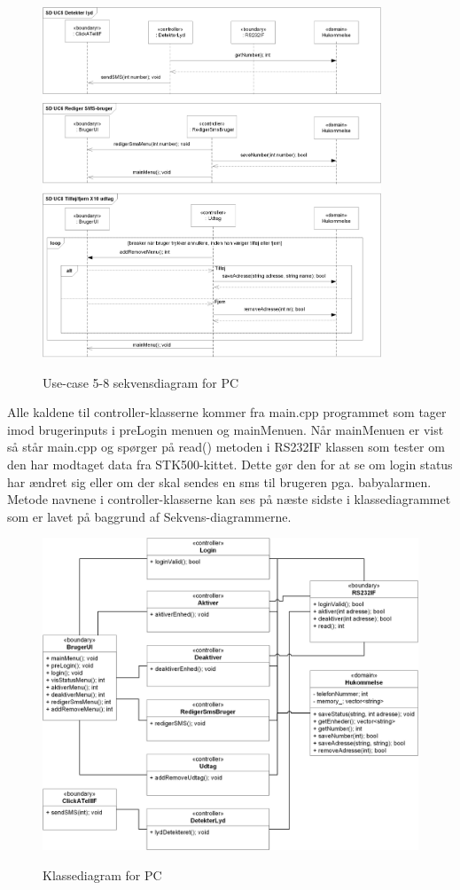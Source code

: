 \begin{figure}[H] \centering
     {\includegraphics[width=0.9\textwidth]{billeder/uml/PC_SD2}}
     \caption{Use-case 5-8 sekvensdiagram for PC}
     \label{fig:PC_SD2}
\end{figure}

\clearpage

Alle kaldene til controller-klasserne kommer fra main.cpp programmet som tager imod brugerinputs i preLogin menuen og mainMenuen. Når mainMenuen er vist så står main.cpp og spørger på read() metoden i RS232IF klassen som tester om den har modtaget data fra STK500-kittet. Dette gør den for at se om login status har ændret sig eller om der skal sendes en sms til brugeren pga. babyalarmen.\\
Metode navnene i controller-klasserne kan ses på næste sidste i klassediagrammet som er lavet på baggrund af Sekvens-diagrammerne.

\begin{figure}[H]
     {\includegraphics[width=\textwidth]{billeder/uml/PC_Class}}
     \caption{Klassediagram for PC}
     \label{fig:PC_Class}
\end{figure}

